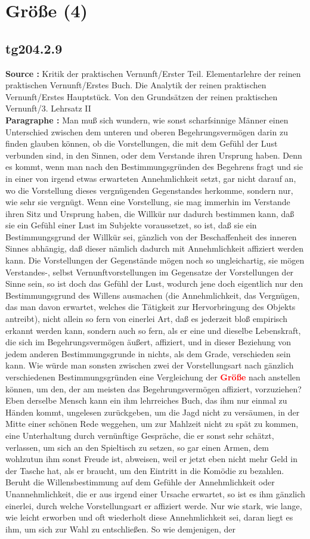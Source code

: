 \documentclass[a4paper,12pt,twoside]{book}
\newcommand{\match}[1]{\textcolor{red}{\textbf{#1}}}
\newcommand{\unnumberedsection}[1]{
	\section*{#1}
	\addcontentsline{toc}{section}{#1}
	\markright{#1}
}
\begin{document}
	\unnumberedsection{Größe (4)} 
	\subsection*{tg204.2.9} 
	\textbf{Source : }Kritik der praktischen Vernunft/Erster Teil. Elementarlehre der reinen praktischen Vernunft/Erstes Buch. Die Analytik der reinen praktischen Vernunft/Erstes Hauptstück. Von den Grundsätzen der reinen praktischen Vernunft/3. Lehrsatz II\\  
	
	\textbf{Paragraphe : }Man muß sich wundern, wie sonst scharfsinnige Männer einen Unterschied zwischen dem unteren und oberen Begehrungsvermögen darin zu finden glauben können, ob die Vorstellungen, die mit dem Gefühl der Lust verbunden sind, in den Sinnen, oder dem Verstande ihren Ursprung haben. Denn es kommt, wenn man nach den Bestimmungsgründen des Begehrens fragt und sie in einer von irgend etwas erwarteten Annehmlichkeit setzt, gar nicht darauf an, wo die Vorstellung dieses vergnügenden Gegenstandes herkomme, sondern nur, wie sehr sie vergnügt. Wenn eine Vorstellung, sie mag immerhin im Verstande ihren Sitz und Ursprung haben, die Willkür nur dadurch bestimmen  kann, daß sie ein Gefühl einer Lust im Subjekte voraussetzet, so ist, daß sie ein Bestimmungsgrund der Willkür sei, gänzlich von der Beschaffenheit des inneren Sinnes abhängig, daß dieser nämlich dadurch mit Annehmlichkeit affiziert werden kann. Die Vorstellungen der Gegenstände mögen noch so ungleichartig, sie mögen Verstandes-, selbst Vernunftvorstellungen im Gegensatze der Vorstellungen der Sinne sein, so ist doch das Gefühl der Lust, wodurch jene doch eigentlich nur den Bestimmungsgrund des Willens ausmachen (die Annehmlichkeit, das Vergnügen, das man davon erwartet, welches die Tätigkeit zur Hervorbringung des Objekts antreibt), nicht allein so fern von einerlei Art, daß es jederzeit bloß empirisch erkannt werden kann, sondern auch so fern, als er eine und dieselbe Lebenskraft, die sich im Begehrungsvermögen äußert, affiziert, und in dieser Beziehung von jedem anderen Bestimmungsgrunde in nichts, als dem Grade, verschieden sein kann. Wie würde man sonsten zwischen zwei der Vorstellungsart nach gänzlich verschiedenen Bestimmungsgründen eine Vergleichung der \match{Größe} nach anstellen können, um den, der am meisten das Begehrungsvermögen affiziert, vorzuziehen? Eben derselbe Mensch kann ein ihm lehrreiches Buch, das ihm nur einmal zu Händen kommt, ungelesen zurückgeben, um die Jagd nicht zu versäumen, in der Mitte einer schönen Rede weggehen, um zur Mahlzeit nicht zu spät zu kommen, eine Unterhaltung durch vernünftige Gespräche, die er sonst sehr schätzt, verlassen, um sich an den Spieltisch zu setzen, so gar einen Armen, dem wohlzutun ihm sonst Freude ist, abweisen, weil er jetzt eben nicht mehr Geld in der Tasche hat, als er braucht, um den Eintritt in die Komödie zu bezahlen. Beruht die Willensbestimmung auf dem Gefühle der Annehmlichkeit oder Unannehmlichkeit, die er aus irgend einer Ursache erwartet, so ist es ihm gänzlich einerlei, durch welche Vorstellungsart er affiziert werde. Nur wie stark, wie lange, wie leicht erworben und oft wiederholt diese Annehmlichkeit sei, daran liegt es ihm, um sich zur Wahl zu entschließen. So wie demjenigen, der 
\end{document}
